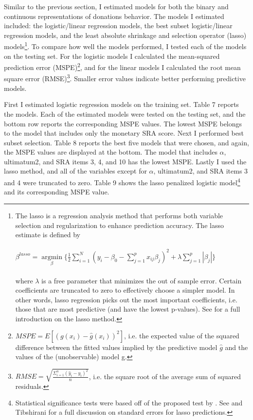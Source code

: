 \documentclass[12pt]{article}
\begin{document}
Similar to the previous section, I estimated models for both the binary and continuous representations of donations behavior. The models I estimated included: the logistic/linear regression models, the best subset logistic/linear regression models, and the least absolute shrinkage and selection operator (lasso) models\footnote{The lasso is a regression analysis method that performs both variable selection and regularization to enhance prediction accuracy. The lasso estimate is defined by\\ \\
\( \beta^{lasso}=\mathop\mathrm{argmin}\limits_{\beta} \{ \frac{1}{2} \sum_{i=1}^{N} (y_{i} - \beta_{0} - \sum_{j=1}^{p}x_{ij}\beta _{j})^{2}+\lambda\sum_{j=1}^{p}|\beta _{j}|\} \) \\ \\
where \(\lambda\) is a free parameter that minimizes the out of sample error. Certain coefficients are truncated to zero to effectively choose a simpler model. In other words, lasso regression picks out the most important coefficients, i.e. those that are most predictive (and have the lowest p-values). See \cite{tibshirani_1996} for a full introduction on the lasso method.}. To compare how well the models performed, I tested each of the models on the testing set. For the logistic models I calculated the mean-squared prediction error (MSPE)\footnote{\(MSPE = E[(g(x_{i}) - \hat{g}(x_{i}))^{2}]\), i.e. the expected value of the squared difference between the fitted values implied by the predictive model \(\hat{g}\) and the values of the (unobservable) model g.}, and for the linear models I calculated the root mean square error (RMSE)\footnote{\(RMSE = \sqrt{\frac{\Sigma_{i=1}^{n}{(\hat{y}_{i} - y_{i})^2}}{n}}\), i.e. the square root of the average sum of squared residuals.}. Smaller error values indicate better performing predictive models.

First I estimated logistic regression models on the training set. Table 7 reports the models. Each of the estimated models were tested on the testing set, and the bottom row reports the corresponding MSPE values. The lowest MSPE belongs to the model that includes only the monetary SRA score. Next I performed best subset selection. Table 8 reports the best five models that were chosen, and again, the MSPE values are displayed at the bottom. The model that includes \(\alpha\), ultimatum2, and SRA items 3, 4, and 10 has the lowest MSPE. Lastly I used the lasso method, and all of the variables except for \(\alpha\), ultimatum2, and SRA items 3 and 4 were truncated to zero. Table 9 shows the lasso penalized logistic model\footnote{Statistical significance tests were based off of the proposed test by \cite{lockhart_2014}. See \cite{kyung_2010} and Tibshirani for a full discussion on standard errors for lasso predictions.} and its corresponding MSPE value.
\end{document}
